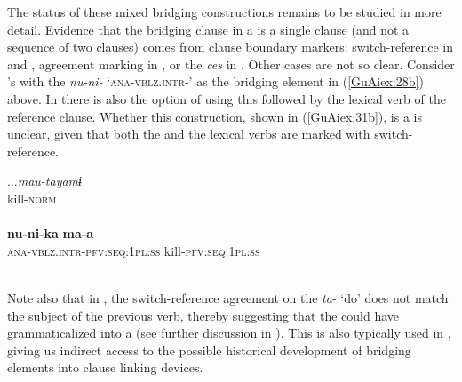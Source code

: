 \documentclass[output=paper]{LSP/langsci}
\begin{document}
The status of these mixed bridging constructions remains to be studied in more detail. Evidence that the bridging clause in a  is a single clause (and not a sequence of two clauses) comes from clause boundary markers: switch-reference in  and , agreement marking in , or the  \textit{ces}  in . Other cases are not so clear. Consider ’s  with the  \textit{nu-ni-} `\textsc{ana-vblz.intr-}' as the bridging element in (\ref{GuAiex:28b}) above. In  there is also the option of using this  followed by the lexical verb of the reference clause. Whether this construction, shown in (\ref{GuAiex:31b}), is a  is unclear, given that both the  and the lexical verbs are marked with switch-reference. 

\begin{exe}
\ex \label{GuAiex:31ac}
\begin{xlist}
\ex \label{GuAiex:31a}
\gll ...\textit{mau-tayamɨ}\\
 kill-\textsc{norm}\\
\glt {} \\
\ex \label{GuAiex:31b}
\gll  \textbf{nu-ni-ka} \textbf{ma-a}\\
\textsc{ana-vblz.intr-pfv:seq:1pl:ss}   kill-\textsc{pfv:seq:1pl:ss}\\
\glt {}\\
\ex \label{GuAiex:31c}
\glt {}
\end{xlist}
\end{exe} 

Note also that in , the switch-reference agreement on the  \textit{ta}- `do' does not match the subject of the previous verb, thereby suggesting that the  could have grammaticalized into a  (see further discussion in ). This  is also typically used in , giving us indirect access to the possible historical development of bridging elements into clause linking devices.
\end{document}
